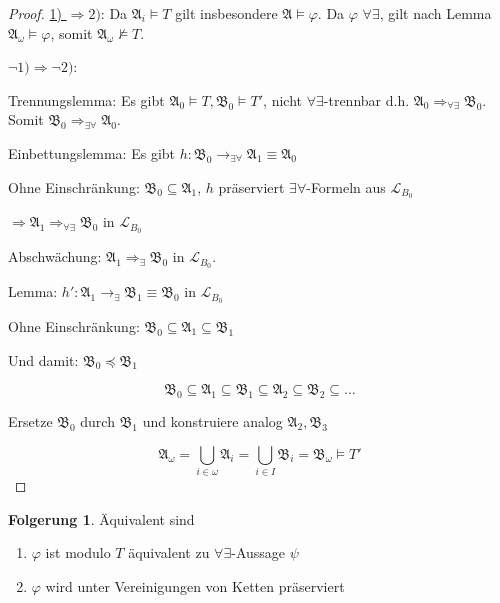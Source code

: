 \documentclass[12pt,parskip=full]{scrartcl}
\newcommand{\heading}{\underline}
\theoremstyle{definition}
\newtheorem{corollary}[theorem]{Folgerung}
\begin{document}
	\begin{proof}
		\heading{1) $\Rightarrow 2)$}: Da $\mathfrak{A}_i \models T$ gilt insbesondere $\mathfrak{A} \models \varphi$. Da $\varphi$ $\forall\exists$, gilt nach Lemma $\mathfrak{A}_\omega \models \varphi$, somit $\mathfrak{A}_\omega \not\models T$.
		
		\heading{$\lnot 1) \Rightarrow \lnot 2)$}:
		
		Trennungslemma: Es gibt $\mathfrak{A}_0 \models T, \mathfrak{B}_0 \models T'$, nicht $\forall \exists$-trennbar d.h. $\mathfrak{A}_0 \Rightarrow_{\forall\exists} \mathfrak{B}_0$. Somit $\mathfrak{B}_0 \Rightarrow_{\exists\forall} \mathfrak{A}_0$.
		
		Einbettungslemma: Es gibt $h: \mathfrak{B}_0 \to_{\exists\forall} \mathfrak{A}_1 \equiv \mathfrak{A}_0$
		
		Ohne Einschränkung: $\mathfrak{B}_0 \subseteq \mathfrak{A}_1$, $h$ präserviert $\exists\forall$-Formeln aus $\mathcal{L}_{B_0}$
		
		$\Rightarrow \mathfrak{A}_1 \Rightarrow_{\forall\exists} \mathfrak{B}_0$ in $\mathcal{L}_{B_0}$
		
		Abschwächung: $\mathfrak{A}_1 \Rightarrow_\exists \mathfrak{B}_0$ in $\mathcal{L}_{B_0}$.
		
		Lemma: $h': \mathfrak{A}_1 \to_\exists \mathfrak{B}_1 \equiv \mathfrak{B}_0$ in $\mathcal{L}_{B_0}$
		
		Ohne Einschränkung: $\mathfrak{B}_0 \subseteq \mathfrak{A}_1 \subseteq \mathfrak{B}_1$
		
		Und damit: $\mathfrak{B}_0 \preccurlyeq \mathfrak{B}_1$
		
		\begin{equation*}
			\mathfrak{B}_0 \subseteq \mathfrak{A}_1 \subseteq \mathfrak{B}_1 \subseteq \mathfrak{A}_2 \subseteq \mathfrak{B}_2 \subseteq \dots
		\end{equation*}
		
		Ersetze $\mathfrak{B}_0$ durch $\mathfrak{B}_1$ und konstruiere analog $\mathfrak{A}_2, \mathfrak{B}_3$
		
		\begin{equation*}
			\mathfrak{A}_\omega = \bigcup_{i \in \omega} \mathfrak{A}_i = \bigcup_{i \in I} \mathfrak{B}_i = \mathfrak{B}_\omega \models T'
		\end{equation*}
	\end{proof}

	\begin{corollary}
		Äquivalent sind
		\begin{enumerate}
			\item $\varphi$ ist modulo $T$ äquivalent zu $\forall\exists$-Aussage $\psi$
			\item $\varphi$ wird unter Vereinigungen von Ketten präserviert
		\end{enumerate}
	\end{corollary}
\end{document}
